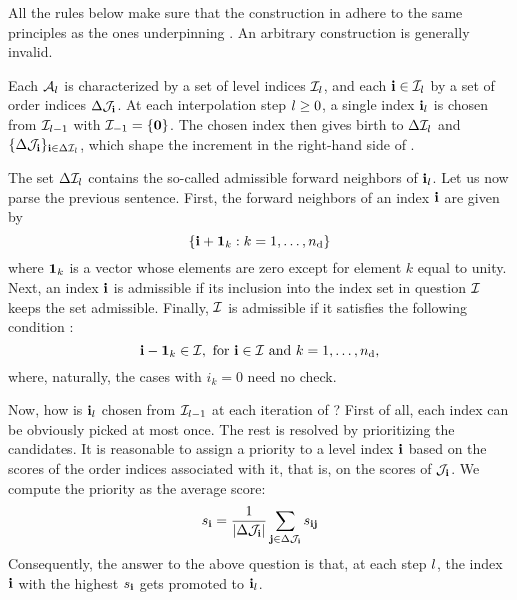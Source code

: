 \begin{remark}
All the rules below make sure that the construction in 
adhere to the same principles as the ones underpinning
. An arbitrary construction is generally invalid.
\end{remark}

Each $\mathcal{A}_{l}$ is characterized by a set of level indices
$\mathcal{I}_l$, and each $\mathbf{i} \in \mathcal{I}_l$ by a set of order indices
$\Delta\mathcal{J}_{\mathbf{i}}$. At each interpolation step $l \geq 0$, a single index
$\mathbf{i}_l$ is chosen from $\mathcal{I}_{l-1}$ with $\mathcal{I}_{-1} = \{ \mathbf{0} \}$. The
chosen index then gives birth to $\Delta\mathcal{I}_l$ and $\{ \Delta\mathcal{J}_{\mathbf{i}}
\}_{\mathbf{i} \in \Delta\mathcal{I}_l}$, which shape the increment in the right-hand side
of .

The set $\Delta\mathcal{I}_l$ contains the so-called admissible forward neighbors
of $\mathbf{i}_l$. Let us now parse the previous sentence. First, the forward
neighbors of an index $\mathbf{i}$ are given by
\begin{equation} \elab{forward-level-neighbors}
  \left\{ \vi + \v{1}_k: k = 1, \dots, \nin \right\}
\end{equation}
where $\mathbf{1}_k$ is a vector whose elements are zero except for element $k$ equal
to unity. Next, an index $\mathbf{i}$ is admissible if its inclusion into the index set
in question $\mathcal{I}$ keeps the set admissible. Finally, $\mathcal{I}$ is admissible
if it satisfies the following condition \cite{klimke2006}:
\begin{equation} \elab{admissibility}
  \vi - \v{1}_k \in \lindex, \text{ for $\vi \in \lindex$ and $k = 1, \dots, \nin$,}
\end{equation}
where, naturally, the cases with $i_k = 0$ need no check.

Now, how is $\mathbf{i}_l$ chosen from $\mathcal{I}_{l-1}$ at each iteration of
? First of all, each index can be obviously picked at most
once. The rest is resolved by prioritizing the candidates. It is reasonable to
assign a priority to a level index $\mathbf{i}$ based on the scores of the order
indices associated with it, that is, on the scores of $\mathcal{J}_{\mathbf{i}}$. We compute
the priority as the average score:
\[
  s_{\mathbf{i}} = \frac{1}{\left| \Delta\mathcal{J}_{\mathbf{i}} \right|} \sum_{\mathbf{j} \in \Delta\mathcal{J}_{\mathbf{i}}} s_{\mathbf{i}\mathbf{j}}
\]
Consequently, the answer to the above question is that, at each step $l$, the
index $\mathbf{i}$ with the highest $s_{\mathbf{i}}$ gets promoted to $\mathbf{i}_l$.

